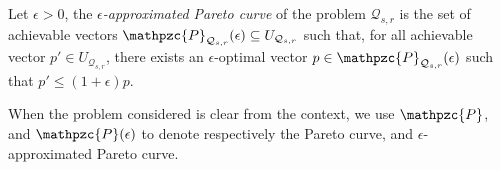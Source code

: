 \begin{definition}
  Let $\epsilon > 0$, the \textit{$\epsilon$-approximated Pareto curve} of the \MOSR{} problem $\mathcal{Q}_{s, r}$ is the set of achievable vectors $\mathpzc{P}_{\mathcal{Q}_{s, r}}(\epsilon) \subseteq U_{\mathcal{Q}_{s, r}}$ such that, for all achievable vector $p' \in U_{\mathcal{Q}_{s, r}}$, there exists an $\epsilon$-optimal vector $p \in \mathpzc{P}_{\mathcal{Q}_{s, r}}(\epsilon)$
  such that $p' \leq (1 + \epsilon) p$.
\end{definition}

\begin{notation}
When the \MOSR{} problem considered is clear from the context, we use $\mathpzc{P}$, and $\mathpzc{P}(\epsilon)$ to denote respectively the Pareto curve, and $\epsilon$-approximated Pareto curve.
\end{notation}

